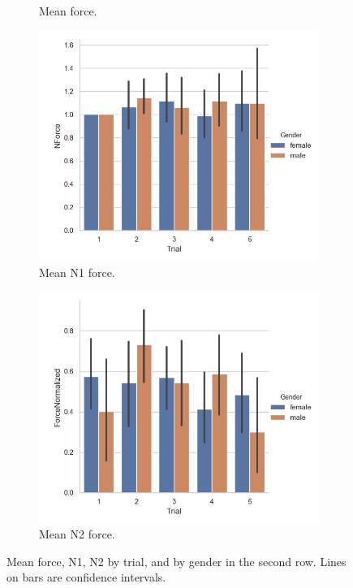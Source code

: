 \begin{figure}[H]
\begin{subfigure}[b]{0.3\textwidth}
         \caption{Mean force.}
         \label{fig:forceMeanTrialGen}
     \end{subfigure}
     \begin{subfigure}[b]{0.3\textwidth}
         \centering
         \includegraphics[scale=0.4]{Files/Plots/forceNforce_mean_by_trial_gen.png}
         \caption{Mean N1 force.}
         \label{fig:forceN1TrialGen}
     \end{subfigure}
      \begin{subfigure}[b]{0.3\textwidth}
         \centering
         \includegraphics[scale=0.4]{Files/Plots/forceNormalized_mean_by_trial_gen.png}
         \caption{Mean N2 force.}
         \label{fig:forceN2TrialGen}
     \end{subfigure}
     \caption{Mean force, N1, N2  by trial, and by gender in the second row. Lines on bars are confidence intervals.}
         \label{fig:allForceTrial}
\end{figure} 

